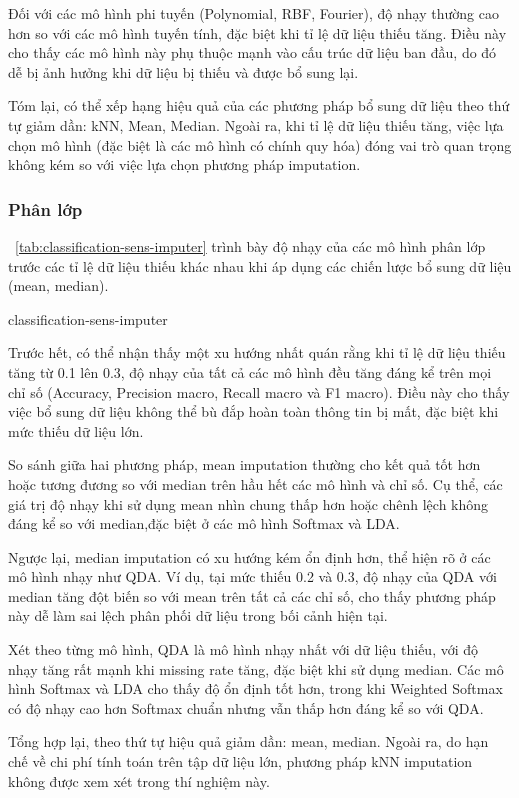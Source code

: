 Đối với các mô hình phi tuyến (Polynomial, RBF, Fourier), độ nhạy thường cao
hơn so với các mô hình tuyến tính, đặc biệt khi tỉ lệ dữ liệu thiếu tăng. Điều
này cho thấy các mô hình này phụ thuộc mạnh vào cấu trúc dữ liệu ban đầu, do đó
dễ bị ảnh hưởng khi dữ liệu bị thiếu và được bổ sung lại.

Tóm lại, có thể xếp hạng hiệu quả của các phương pháp bổ sung dữ liệu theo thứ
tự giảm dần: kNN, Mean, Median. Ngoài ra, khi tỉ lệ dữ liệu thiếu tăng, việc
lựa chọn mô hình (đặc biệt là các mô hình có chính quy hóa) đóng vai trò quan
trọng không kém so với việc lựa chọn phương pháp imputation.

\subsubsection{Phân lớp}

\tablename~\ref{tab:classification-sens-imputer} trình bày độ nhạy của các mô
hình phân lớp trước các tỉ lệ dữ liệu thiếu khác nhau khi áp dụng các chiến
lược bổ sung dữ liệu (mean, median).

{classification-sens-imputer}

Trước hết, có thể nhận thấy một xu hướng nhất quán rằng khi tỉ lệ dữ liệu thiếu
tăng từ 0.1 lên 0.3, độ nhạy của tất cả các mô hình đều tăng đáng kể trên mọi
chỉ số (Accuracy, Precision macro, Recall macro và F1 macro). Điều này cho thấy
việc bổ sung dữ liệu không thể bù đắp hoàn toàn thông tin bị mất, đặc biệt khi
mức thiếu dữ liệu lớn.

So sánh giữa hai phương pháp, mean imputation thường cho kết quả tốt hơn hoặc
tương đương so với median trên hầu hết các mô hình và chỉ số. Cụ thể, các giá
trị độ nhạy khi sử dụng mean nhìn chung thấp hơn hoặc chênh lệch không đáng kể
so với median,đặc biệt ở các mô hình Softmax và LDA.

Ngược lại, median imputation có xu hướng kém ổn định hơn, thể hiện rõ ở các mô
hình nhạy như QDA. Ví dụ, tại mức thiếu 0.2 và 0.3, độ nhạy của QDA với median
tăng đột biến so với mean trên tất cả các chỉ số, cho thấy phương pháp này dễ
làm sai lệch phân phối dữ liệu trong bối cảnh hiện tại.

Xét theo từng mô hình, QDA là mô hình nhạy nhất với dữ liệu thiếu, với độ nhạy
tăng rất mạnh khi missing rate tăng, đặc biệt khi sử dụng median. Các mô hình
Softmax và LDA cho thấy độ ổn định tốt hơn, trong khi Weighted Softmax có độ
nhạy cao hơn Softmax chuẩn nhưng vẫn thấp hơn đáng kể so với QDA.

Tổng hợp lại, theo thứ tự hiệu quả giảm dần: mean, median. Ngoài ra, do hạn chế
về chi phí tính toán trên tập dữ liệu lớn, phương pháp kNN imputation không
được xem xét trong thí nghiệm này.

